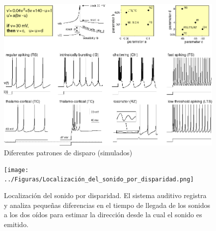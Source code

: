 \begin{figure}[h]
 \centering
 \includegraphics[scale=0.5]{../Figuras/Simple_Model_of_Spiking_Neurons.png}
 \caption{Diferentes patrones de disparo (simulados)}
 \label{fig:simpleModel}
\end{figure}

\begin{figure}[h]
 \centering
 \texttt{[image: ../Figuras/Localización\_del\_sonido\_por\_disparidad.png]}
 \caption{Localización del sonido por disparidad. El sistema auditivo registra y analiza pequeñas diferencias en el tiempo de llegada de
los sonidos a los dos oídos para estimar la dirección desde la cual el sonido es emitido.}
 \label{fig:sonidoDisp}
\end{figure}

